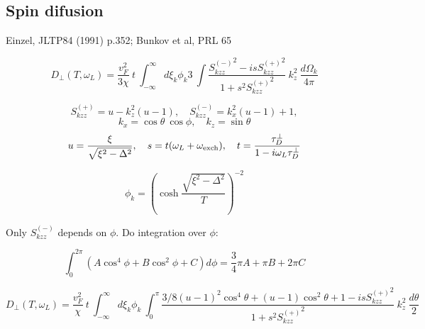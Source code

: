 \documentclass[a4paper]{article}
\begin{document}
\subsection*{Spin difusion}

\def\tdp{\tau_D^\perp}
\def\ol{\omega_L}
\def\oe{\omega_{\rm exch}}
\def\sm{S_{kzz}^{(-)}}
\def\sp{S_{kzz}^{(+)}}

Einzel, JLTP84 (1991) p.352; Bunkov et al, PRL 65

$$
D_\perp (T, \ol) =
  \frac{v_F^2}{3\chi}\ t
  \ \int_{-\infty}^{\infty}
  d\xi_k\phi_k 3
  \ \int \frac{{\sm}^2 - is{\sp}^2}{1+s^2{\sp}^2}
  \  k_z^2\ \frac{d\Omega_k}{4\pi}
$$

$$
\sp = u - k_z^2(u-1),\quad
\sm = k_x^2(u-1) + 1,
$$
$$
k_x = \cos\theta\ \cos\phi, \quad
k_z = \sin\theta
$$
$$
u=\frac{\xi}{\sqrt{\xi^2-\Delta^2}}, \quad
s = t(\ol+\oe),\quad
t = \frac{\tdp}{1-i\ol\tdp}
$$

$$
\phi_k = \left(\cosh\frac{\sqrt{\xi^2-\Delta^2}}{T}\right)^{-2}
$$

Only $\sm$ depends on $\phi$. Do integration over $\phi$:

$$
\int_0^{2\pi} (A\cos^4\phi + B\cos^2\phi + C) d\phi =
\frac34 \pi A + \pi B + 2\pi C
$$


$$
D_\perp (T, \ol) =
  \frac{v_F^2}{\chi}\ t
  \ \int_{-\infty}^{\infty}
  d\xi_k\phi_k
  \ \int_0^\pi
   \frac{3/8(u-1)^2\cos^4\theta + (u-1)\cos^2\theta + 1 - is{\sp}^2}{1+s^2{\sp}^2}
  \  k_z^2\ \frac{d\theta}{2}
$$

$$
$$
\end{document}

